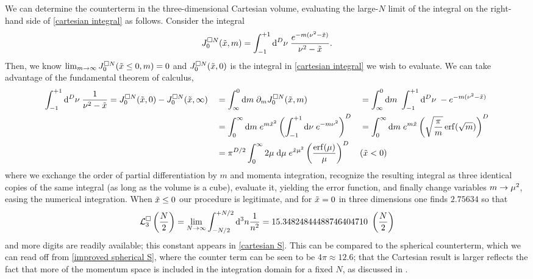 We can determine the counterterm in the three-dimensional Cartesian volume, evaluating the large-$N$ limit of the integral on the right-hand side of \eqref{cartesian integral} as follows.  Consider the integral
\begin{equation}
	J^{\square N}_0(\tilde{x}, m) = \int_{-1}^{+1} \mathrm{d}^D\nu\; \frac{e^{-m (\nu^2-\tilde{x})}}{\nu^2-\tilde{x}}.
\end{equation}
Then, we know $\lim_{m\rightarrow\infty} J^{\square N}_0(\tilde{x}\leq0, m) = 0$ and $J^{\square N}_0(\tilde{x}, 0)$ is the integral in \eqref{cartesian integral} we wish to evaluate.
We can take advantage of the fundamental theorem of calculus,
\begin{align}
	\int_{-1}^{+1} \mathrm{d}^D\nu\; \frac{1}{\nu^2-\tilde{x}}
    &=
    J^{\square N}_0(\tilde{x},0) - J^{\square N}_0(\tilde{x},\infty)
		&&= 	\int_{\infty}^{0} \mathrm{d}m\; \partial_m J^{\square N}_0(\tilde{x},m)
		&&=	\int_{\infty}^{0} \mathrm{d}m\ \int_{-1}^{+1} \mathrm{d}^D\nu\; -e^{-m (\nu^2-\tilde{x})}
		\nonumber\\
		&&&=	\int_0^\infty \mathrm{d}m\; e^{m \tilde{x}^2}\left(\int_{-1}^{+1} \mathrm{d}\nu\; e^{-m \nu^2}\right)^D
		&&=	\int_0^\infty \mathrm{d}m\; e^{m\tilde{x}}\left(\sqrt{\frac{\pi}{m}} \operatorname{erf}(\sqrt{m})\right)^D
        \nonumber\\
    &&&=
    \pi^{D/2} \int_{0}^{\infty} 2\mu\; \mathrm{d}\mu\; e^{\tilde{x} \mu^2} \left(\frac{\operatorname{erf}(\mu)}{\mu}\right)^D
    &&(\tilde{x}<0)
\end{align}
where we exchange the order of partial differentiation by $m$ and momenta integration, recognize the resulting integral as three identical copies of the same integral (as long as the volume is a cube), evaluate it, yielding the error function, and finally change variables $m\rightarrow\mu^2$, easing the numerical integration.
When $\tilde{x}\leq0$ our procedure is legitimate, and for $\tilde{x}=0$ in three dimensions one finds $2.75634$ so that
\begin{equation}
    \label{eq:cartesian counterterm}
    \mathcal{L}^\square_3 \left(\frac{N}{2}\right) = \lim_{N\rightarrow\infty}\int_{-N/2}^{+N/2} \mathrm{d}^3n \frac{1}{n^2} = 15.34824844488746404710\ \left(\frac{N}{2}\right)
\end{equation}
and more digits are readily available; this constant appears in \eqref{cartesian S}.
This can be compared to the spherical counterterm, which we can read off from \eqref{improved spherical S}, where the counter term can be seen to be $4\pi \approx 12.6 $; that the Cartesian result is larger reflects the fact that more of the momentum space is included in the integration domain for a fixed $N$, as discussed in .

